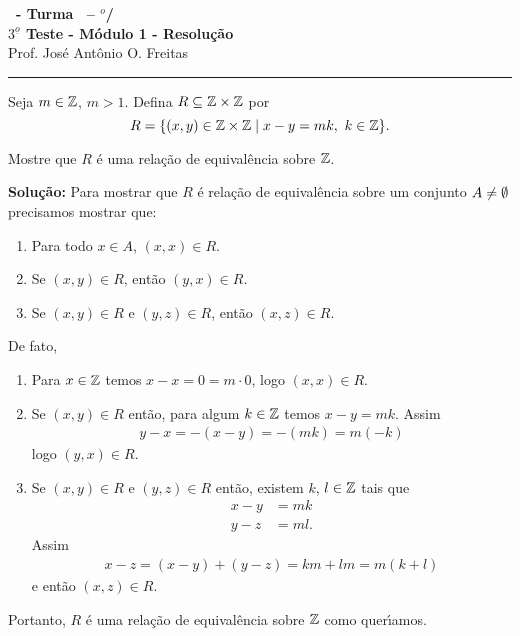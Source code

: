 \documentclass[12pt]{exam}
\begin{document}
\begin{center}
{\Large\bf \disciplina\ - Turma \turma\ -- \semestre$^{o}$/\ano} \\ \vspace{9pt} {\large\bf
$3^{\underline{o}}$ Teste - M\'odulo 1 - Resolu\c{c}\~ao}\\
\vspace{9pt} Prof. Jos{\'e} Ant{\^o}nio O. Freitas
\end{center}
\hrule

\vspace{.6cm}

\questao Seja $m \in \mathbb{Z}$, $m > 1$. Defina $R \subseteq \mathbb{Z} \times \mathbb{Z}$ por
\[
	R = \{ (x, y) \in \z \times \z \mid x - y = mk,\ k \in \z\}.
\]

Mostre que $R$ \'e uma rela\c{c}\~ao de equival\^encia sobre $\mathbb{Z}$.

\noindent\textbf{Solu\c{c}\~ao:} Para mostrar que $R$ \'e rela\c{c}\~ao de equival\^encia sobre um conjunto $A \ne \emptyset$ precisamos mostrar que:
\begin{enumerate}[label={\roman*})]
	\item Para todo $x \in A$, $(x, x) \in R$.
	\item Se $(x, y) \in R$, ent\~ao $(y, x) \in R$.
	\item Se $(x, y) \in R$ e $(y, z) \in R$, ent\~ao $(x, z) \in R$.
\end{enumerate}

De fato,
\begin{enumerate}[label={\roman*})]
	\item Para $x \in \mathbb{Z}$ temos $x - x = 0 = m\cdot 0$, logo $(x, x) \in R$.
	\item Se $(x, y)\in R$ ent\~ao, para algum $k \in \mathbb{Z}$ temos $x - y  = mk$. Assim
	\begin{align*}
		y - x = -(x - y) = -(mk) = m(-k)
	\end{align*}
	logo $(y, x) \in R$.
	\item Se $(x, y) \in R$ e $(y, z) \in R$ ent\~ao, existem $k$, $l \in \mathbb{Z}$ tais que
	\begin{align*}
		x - y &= mk\\
		y - z &= ml.
	\end{align*}
	Assim
	\begin{align*}
		x - z = (x - y) + (y - z) = km + lm = m(k + l)
	\end{align*}
	e ent\~ao $(x, z) \in R$.
\end{enumerate}

Portanto, $R$ \'e uma rela\c{c}\~ao de equival\^encia sobre $\mathbb{Z}$ como quer{\'\i}amos.
\end{document}
